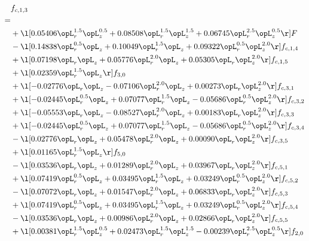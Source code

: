\begin{alignat}{2} 
\label{eq:f_13_2} 
& f_{c,1,3} \nonumber \\ 
 = \\ 
& + \l[  0.05406 \opL_r^{1.5} \opL_z^{0.5} +  0.08508 \opL_r^{1.5} \opL_z^{1.5} +  0.06745 \opL_r^{2.5} \opL_z^{0.5}  \r] F \nonumber \\ 
& - \l[  0.14838 \opL_r^{0.5} \opL_z +  0.10049 \opL_r^{1.5} \opL_z +  0.09322 \opL_r^{0.5} \opL_z^{2.0}  \r] f_{c,1,4} \nonumber \\ 
& + \l[  0.07198 \opL_r \opL_z +  0.05776 \opL_r^{2.0} \opL_z +  0.05305 \opL_r \opL_z^{2.0}  \r] f_{c,1,5} \nonumber \\ 
& + \l[  0.02359 \opL_r^{1.5} \opL_z  \r] f_{3,0} \nonumber \\ 
& + \l[  -0.02776 \opL_r \opL_z   -0.07106 \opL_r^{2.0} \opL_z +  0.00273 \opL_r \opL_z^{2.0}  \r] f_{c,3,1} \nonumber \\ 
& + \l[  -0.02445 \opL_r^{0.5} \opL_z +  0.07077 \opL_r^{1.5} \opL_z   -0.05686 \opL_r^{0.5} \opL_z^{2.0}  \r] f_{c,3,2} \nonumber \\ 
& + \l[  -0.05553 \opL_r \opL_z   -0.08527 \opL_r^{2.0} \opL_z +  0.00183 \opL_r \opL_z^{2.0}  \r] f_{c,3,3} \nonumber \\ 
& + \l[  -0.02445 \opL_r^{0.5} \opL_z +  0.07077 \opL_r^{1.5} \opL_z   -0.05686 \opL_r^{0.5} \opL_z^{2.0}  \r] f_{c,3,4} \nonumber \\ 
& - \l[  0.02776 \opL_r \opL_z +  0.05478 \opL_r^{2.0} \opL_z +  0.00090 \opL_r \opL_z^{2.0}  \r] f_{c,3,5} \nonumber \\ 
& + \l[  0.01165 \opL_r^{1.5} \opL_z  \r] f_{5,0} \nonumber \\ 
& - \l[  0.03536 \opL_r \opL_z +  0.01289 \opL_r^{2.0} \opL_z +  0.03967 \opL_r \opL_z^{2.0}  \r] f_{c,5,1} \nonumber \\ 
& + \l[  0.07419 \opL_r^{0.5} \opL_z +  0.03495 \opL_r^{1.5} \opL_z +  0.03249 \opL_r^{0.5} \opL_z^{2.0}  \r] f_{c,5,2} \nonumber \\ 
& - \l[  0.07072 \opL_r \opL_z +  0.01547 \opL_r^{2.0} \opL_z +  0.06833 \opL_r \opL_z^{2.0}  \r] f_{c,5,3} \nonumber \\ 
& + \l[  0.07419 \opL_r^{0.5} \opL_z +  0.03495 \opL_r^{1.5} \opL_z +  0.03249 \opL_r^{0.5} \opL_z^{2.0}  \r] f_{c,5,4} \nonumber \\ 
& - \l[  0.03536 \opL_r \opL_z +  0.00986 \opL_r^{2.0} \opL_z +  0.02866 \opL_r \opL_z^{2.0}  \r] f_{c,5,5} \nonumber \\ 
& + \l[  0.00381 \opL_r^{1.5} \opL_z^{0.5} +  0.02473 \opL_r^{1.5} \opL_z^{1.5}   -0.00239 \opL_r^{2.5} \opL_z^{0.5}  \r] f_{2,0} \nonumber \\ 

\end{alignat}
